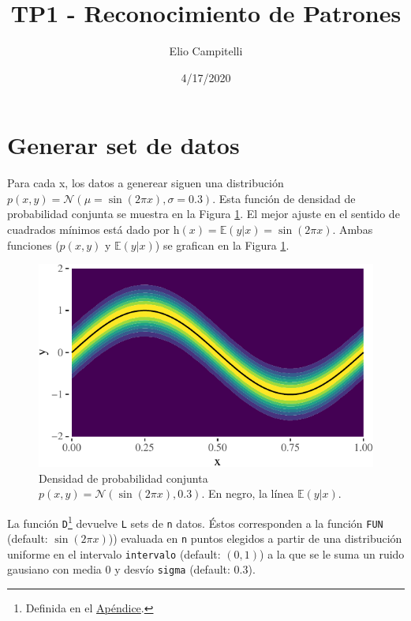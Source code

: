 \documentclass[]{tufte-handout}
\title{TP1 - Reconocimiento de Patrones}
\author{Elio Campitelli}
\date{4/17/2020}
\begin{document}
\maketitle




\hypertarget{generar-set-de-datos}{%
\section{Generar set de datos}\label{generar-set-de-datos}}

Para cada x, los datos a generear siguen una distribución \(p(x, y) = \mathcal{N}(\mu = \sin(2\pi x), \sigma = 0.3)\). Esta función de densidad de probabilidad conjunta se muestra en la Figura \ref{fig:densidad}. El mejor ajuste en el sentido de cuadrados mínimos está dado por \(\mathrm{h}(x) = \mathbb{E}(y|x) =\sin(2\pi x)\). Ambas funciones (\(p(x, y)\) y \(\mathbb{E}(y|x)\)) se grafican en la Figura \ref{fig:densidad}.

\begin{figure}
\includegraphics{TP-Labo-1_files/figure-latex/densidad-1} \caption{Densidad de probabilidad conjunta $p(x, y) = \mathcal{N}(\sin(2\pi x), 0.3)$. En negro, la línea $\mathbb{E}(y|x)$.}\label{fig:densidad}
\end{figure}

La función \texttt{D}\footnote{Definida en el \protect\hyperlink{def-d}{Apéndice}.} devuelve \texttt{L} sets de \texttt{n} datos. Éstos corresponden a la función \texttt{FUN} (default: \(\sin(2\pi x)\))) evaluada en \texttt{n} puntos elegidos a partir de una distribución uniforme en el intervalo \texttt{intervalo} (default: \((0, 1)\)) a la que se le suma un ruido gausiano con media 0 y desvío \texttt{sigma} (default: \(0.3\)).
\end{document}
